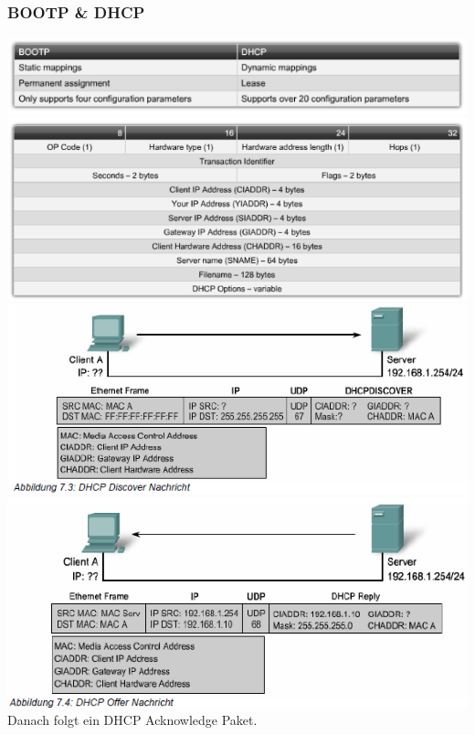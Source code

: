 \documentclass[landscape,twocolumn,a4paper]{article}
\begin{document}
\begin{footnotesize}
\subsubsection{BOOTP \& DHCP}
\includegraphics[scale=0.5]{bootp-dhcp.png}\\
\includegraphics[scale=0.5]{dhcp-message-format.png}\\
\includegraphics[scale=0.4]{dhcp-ablauf-1.png}
\includegraphics[scale=0.4]{dhcp-ablauf-2.png}\\
Danach folgt ein DHCP Acknowledge Paket.


\end{footnotesize}
\end{document}
